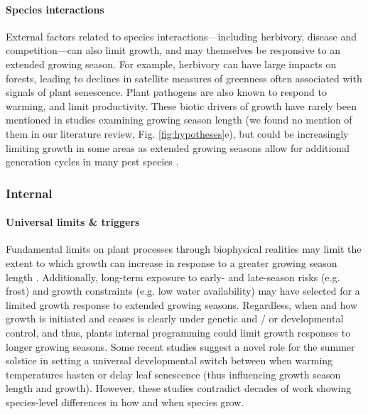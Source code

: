 \documentclass[11pt]{article}
\begin{document}
\paragraph{Species interactions} %

External factors related to species interactions---including herbivory, disease and competition---can also limit growth, and may themselves be responsive to an extended growing season. For example, herbivory can have large impacts on forests, leading to declines in satellite measures of greenness often associated with signals of plant senescence. Plant pathogens are also known to respond to warming, and limit productivity. These biotic drivers of growth have rarely been mentioned in studies examining growing season length (we found no mention of them in our literature review, Fig. \ref{fig:hypotheses}e), but could be increasingly limiting growth in some areas as extended growing seasons allow for additional generation cycles in many pest species \citep{mitton2012mountain,lange2006thresholds}.

\subsubsection*{Internal}

\paragraph{Universal limits \& triggers} 
Fundamental limits on plant processes through biophysical realities may limit the extent to which growth can increase in response to a greater growing season length \citep[e.g., allometry, chemical reaction limits, and genetic architecture that may limit what trait combinations are possible,][]{ackerly2000evolution}. Additionally, long-term exposure to early- and late-season risks (e.g. frost) and growth constraints (e.g. low water availability) may have selected for a limited growth response to extended growing seasons. Regardless, when and how growth is initiated and ceases is clearly under genetic and / or developmental control, and thus, plants internal programming could limit growth responses to longer growing seasons. Some recent studies suggest a novel role for the summer solstice \citep{zohner2023effect} in setting a universal developmental switch between when warming temperatures hasten or delay leaf senescence (thus influencing growth season length and growth). However, these studies contradict decades of work showing species-level differences in how and when species grow.  %
\end{document}
